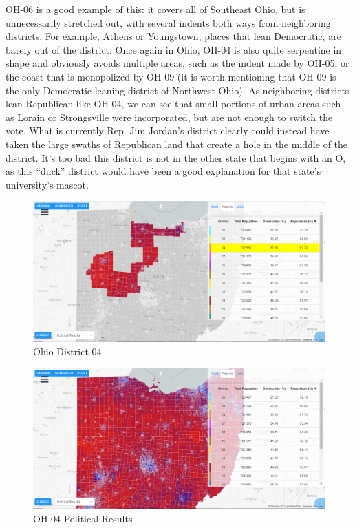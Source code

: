 \documentclass[letterpaper]{article}
\begin{document}
OH-06 is a good example of this: it covers all of Southeast Ohio, but is unnecessarily stretched out, with several indents both ways from neighboring districts. For example, Athens or Youngstown, places that lean Democratic, are barely out of the district. Once again in Ohio, OH-04 is also quite serpentine in shape and obviously avoids multiple areas, such as the indent made by OH-05, or the coast that is monopolized by OH-09 (it is worth mentioning that OH-09 is the only Democratic-leaning district of Northwest Ohio). As neighboring districts lean Republican like OH-04, we can see that small portions of urban areas such as Lorain or Strongsville were incorporated, but are not enough to switch the vote. What is currently Rep. Jim Jordan’s district clearly could instead have taken the large swaths of Republican land that create a hole in the middle of the district. It’s too bad this district is not in the other state that begins with an O, as this “duck” district would have been a good explanation for that state’s university’s mascot.

\begin{figure}[H]
	\includegraphics[width=\linewidth]{./figures/OH-04.png}
	\caption{Ohio District 04}
	\label{fig:oh04border}
\end{figure}

\begin{figure}[H]
	\includegraphics[width=\linewidth]{./figures/OH-04-SurroundingArea.png}
	\caption{OH-04 Political Results}
	\label{fig:oh04political}
\end{figure}
\end{document}
